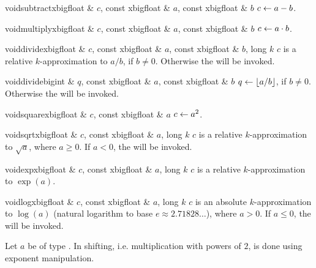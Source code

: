 \begin{fcode}{void}{subtract}{xbigfloat & $c$, const xbigfloat & $a$, const xbigfloat & $b$}
  $c \leftarrow a - b$.
\end{fcode}

\begin{fcode}{void}{multiply}{xbigfloat & $c$, const xbigfloat & $a$, const xbigfloat & $b$}
  $c \leftarrow a \cdot b$.
\end{fcode}

\begin{fcode}{void}{divide}{xbigfloat & $c$, const xbigfloat & $a$, const xbigfloat & $b$, long $k$}
  $c$ is a relative $k$-approximation to $a/b$, if $b \neq 0$.  Otherwise the
  \LEH will be invoked.
\end{fcode}

\begin{fcode}{void}{divide}{bigint & $q$, const xbigfloat & $a$, const xbigfloat & $b$}
  $q \leftarrow \lfloor a/b \rfloor$, if $b \neq 0$.  Otherwise the \LEH will be
  invoked.
\end{fcode}

\begin{fcode}{void}{square}{xbigfloat & $c$, const xbigfloat & $a$}
  $c \leftarrow a^2$.
\end{fcode}

\begin{fcode}{void}{sqrt}{xbigfloat & $c$, const xbigfloat & $a$, long $k$}
  $c$ is a relative $k$-approximation to $\sqrt{a}$, where $a \geq 0$.  If $a < 0$, the
  \LEH will be invoked.
\end{fcode}

\begin{fcode}{void}{exp}{xbigfloat & $c$, const xbigfloat & $a$, long $k$}
  $c$ is a relative $k$-approximation to $\exp(a)$.
\end{fcode}

\begin{fcode}{void}{log}{xbigfloat & $c$, const xbigfloat & $a$, long $k$}
  $c$ is an absolute $k$-approximation to $\log(a)$ (natural logarithm to base $e \approx
  2.71828\dots$), where $a > 0$.  If $a \leq 0$, the \LEH will be invoked.
\end{fcode}



\SHFT

Let $a$ be of type .  In  shifting, i.e. multiplication with
powers of $2$, is done using exponent manipulation.

